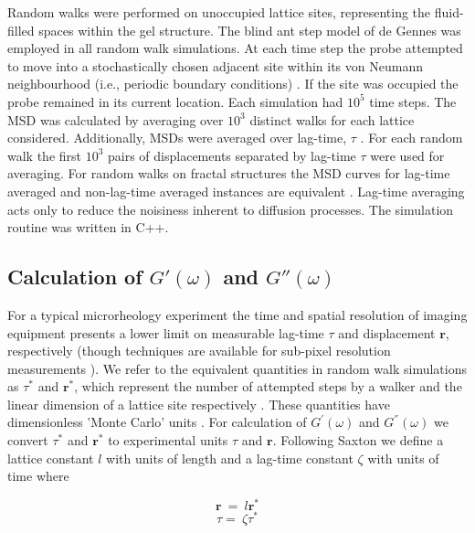 \documentclass[%
 aip,
 amsmath,amssymb,
reprint, onecolumn %
]{revtex4-1}
\begin{document}
Random walks were performed on unoccupied lattice sites, representing the fluid-filled spaces within the gel structure. The blind ant step model of de Gennes \cite{Stauffer1992} was employed in all random walk simulations. At each time step the probe attempted to move into a stochastically chosen adjacent site within its von Neumann neighbourhood (i.e., periodic boundary conditions) \cite{Margolus1987}. If the site was occupied the probe remained in its current location. Each simulation had $10^5$ time steps. The MSD was calculated by averaging over $10^{3}$ distinct walks for each lattice considered. Additionally, MSDs were averaged over lag-time, $\tau$ \cite{Moschakis2013}. For each random walk the first $10^3$ pairs of displacements separated by lag-time $\tau$ were used for averaging. For random walks on fractal structures the MSD curves for lag-time averaged and non-lag-time averaged instances are equivalent \cite{Havlin1983}. Lag-time averaging acts only to reduce the noisiness inherent to diffusion processes. The simulation routine was written in C++.

\subsection{Calculation of $G'(\omega)$ and $G''(\omega)$}

For a typical microrheology experiment the time and spatial resolution of imaging equipment presents a lower limit on measurable lag-time $\tau$ and displacement $\mathbf{r}$, respectively (though techniques are available for sub-pixel resolution measurements \cite{Chenouard2014,Rodriguez2016}). We refer to the equivalent quantities in random walk simulations as $\tau^{*}$ and $\mathbf{r}^{*}$, which represent the number of attempted steps by a walker and the linear dimension of a lattice site respectively \cite{Gefen1983,Saxton1994}. These quantities have dimensionless 'Monte Carlo' units \cite{Saxton1994}. For calculation of $G^{'}(\omega)$ and $G^{''}(\omega)$ we convert $\tau^{*}$ and $\mathbf{r}^{*}$ to experimental units $\tau$ and $\mathbf{r}$. Following Saxton \cite{Saxton1994,Saxton1993} we define a lattice constant $l$ with units of length and a lag-time constant $\zeta$ with units of time where

\begin{equation}
\mathbf{r}\  = \ l\mathbf{r}^{*}
\end{equation}
\begin{equation}
\tau = \ \zeta\tau^{*}
\end{equation}
\end{document}
